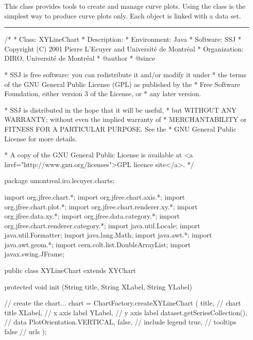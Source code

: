 
This class provides tools to create and manage curve plots. Using the
 class is the simplest way to produce curve plots only.
Each  object is linked with a
 data set.

\bigskip\hrule
\begin{code}
\begin{hide}
/*
 * Class:        XYLineChart
 * Description:  
 * Environment:  Java
 * Software:     SSJ 
 * Copyright (C) 2001  Pierre L'Ecuyer and Université de Montréal
 * Organization: DIRO, Université de Montréal
 * @author       
 * @since

 * SSJ is free software: you can redistribute it and/or modify it under
 * the terms of the GNU General Public License (GPL) as published by the
 * Free Software Foundation, either version 3 of the License, or
 * any later version.

 * SSJ is distributed in the hope that it will be useful,
 * but WITHOUT ANY WARRANTY; without even the implied warranty of
 * MERCHANTABILITY or FITNESS FOR A PARTICULAR PURPOSE.  See the
 * GNU General Public License for more details.

 * A copy of the GNU General Public License is available at
   <a href="http://www.gnu.org/licenses">GPL licence site</a>.
 */
\end{hide}
package umontreal.iro.lecuyer.charts;\begin{hide}

import   org.jfree.chart.*;
import   org.jfree.chart.axis.*;
import   org.jfree.chart.plot.*;
import   org.jfree.chart.renderer.xy.*;
import   org.jfree.data.xy.*;
import   org.jfree.data.category.*;
import   org.jfree.chart.renderer.category.*;
import   java.util.Locale;
import   java.util.Formatter;
import   java.lang.Math;
import   java.awt.*;
import   java.awt.geom.*;
import   cern.colt.list.DoubleArrayList;
import   javax.swing.JFrame;\end{hide}

public class XYLineChart extends XYChart \begin{hide} {

   protected void init (String title, String XLabel, String YLabel) {
      // create the chart...
      chart = ChartFactory.createXYLineChart (
         title,                    // chart title
         XLabel,                   // x axis label
         YLabel,                   // y axis label
         dataset.getSeriesCollection(), // data
         PlotOrientation.VERTICAL,
         false,                    // include legend
         true,                     // tooltips
         false                     // urls
      );

}}
\end{hide}
\end{code}
